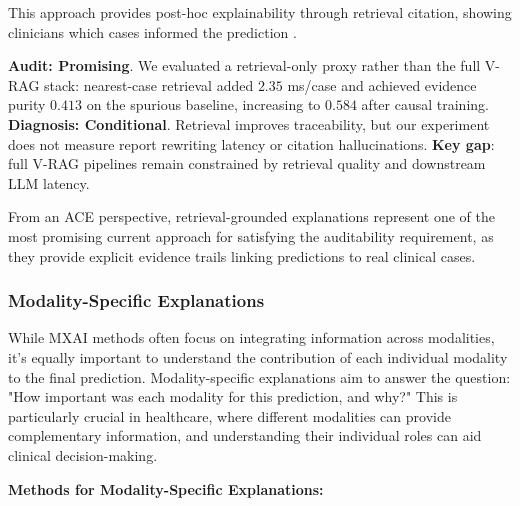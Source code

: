 \documentclass[pdflatex,sn-mathphys-num]{sn-jnl}%
\theoremstyle{thmstyleone}%
\theoremstyle{thmstyletwo}%
\theoremstyle{thmstylethree}%
\begin{document}
\begin{itemize}
This approach provides post-hoc explainability through retrieval citation, showing clinicians which cases informed the prediction \cite{chu2025reducinghallucinationsmedicalmultimodal}.
\begin{tcolorbox}[colback=green!5,colframe=green!50!black,title=\textbf{Clinical Suitability Assessment: Retrieval-Grounded Explanations}]
\textbf{Audit: Promising}. We evaluated a retrieval-only proxy rather than the full V-RAG stack: nearest-case retrieval added $2.35$ ms/case and achieved evidence purity $0.413$ on the spurious baseline, increasing to $0.584$ after causal training. \textbf{Diagnosis: Conditional}. Retrieval improves traceability, but our experiment does not measure report rewriting latency or citation hallucinations. \textbf{Key gap}: full V-RAG pipelines remain constrained by retrieval quality and downstream LLM latency.
\end{tcolorbox}
From an ACE perspective, retrieval-grounded explanations represent one of the most promising current approach for satisfying the auditability requirement, as they provide explicit evidence trails linking predictions to real clinical cases.

\subsubsection{Modality-Specific Explanations}

While MXAI methods often focus on integrating information across modalities, it's equally important to understand the contribution of each individual modality to the final prediction. Modality-specific explanations aim to answer the question: "How important was each modality for this prediction, and why?" This is particularly crucial in healthcare, where different modalities can provide complementary information, and understanding their individual roles can aid clinical decision-making.

\textbf{Methods for Modality-Specific Explanations:}


\end{itemize}
\end{document}
